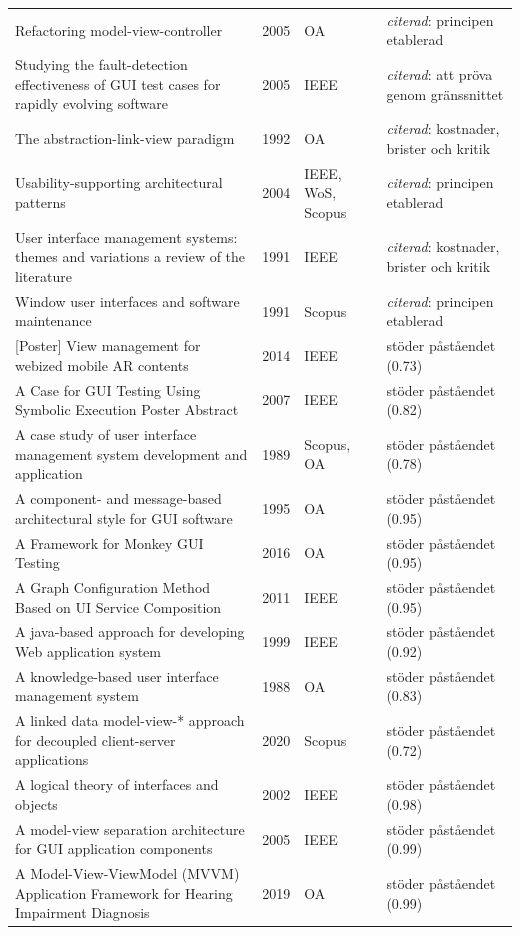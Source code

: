 \begin{longtable}{@{}%
  >{\raggedright\arraybackslash}p{}c%
  >{\raggedright\arraybackslash}p{}%
  >{\raggedright\arraybackslash}p{}@{}}
Refactoring model-view-controller & 2005 & OA & \emph{citerad}: principen etablerad \\
Studying the fault-detection effectiveness of GUI test cases for rapidly evolving software & 2005 & IEEE & \emph{citerad}: att pröva genom gränssnittet \\
The abstraction-link-view paradigm & 1992 & OA & \emph{citerad}: kostnader, brister och kritik \\
Usability-supporting architectural patterns & 2004 & IEEE, WoS, Scopus & \emph{citerad}: principen etablerad \\
User interface management systems: themes and variations a review of the literature & 1991 & IEEE & \emph{citerad}: kostnader, brister och kritik \\
Window user interfaces and software maintenance & 1991 & Scopus & \emph{citerad}: principen etablerad \\
{}[Poster] View management for webized mobile AR contents & 2014 & IEEE & stöder påståendet (0.73) \\
A Case for GUI Testing Using Symbolic Execution Poster Abstract & 2007 & IEEE & stöder påståendet (0.82) \\
A case study of user interface management system development and application & 1989 & Scopus, OA & stöder påståendet (0.78) \\
A component- and message-based architectural style for GUI software & 1995 & OA & stöder påståendet (0.95) \\
A Framework for Monkey GUI Testing & 2016 & OA & stöder påståendet (0.95) \\
A Graph Configuration Method Based on UI Service Composition & 2011 & IEEE & stöder påståendet (0.95) \\
A java-based approach for developing Web application system & 1999 & IEEE & stöder påståendet (0.92) \\
A knowledge-based user interface management system & 1988 & OA & stöder påståendet (0.83) \\
A linked data model-view-* approach for decoupled client-server applications & 2020 & Scopus & stöder påståendet (0.72) \\
A logical theory of interfaces and objects & 2002 & IEEE & stöder påståendet (0.98) \\
A model-view separation architecture for GUI application components & 2005 & IEEE & stöder påståendet (0.99) \\
A Model-View-ViewModel (MVVM) Application Framework for Hearing Impairment Diagnosis & 2019 & OA & stöder påståendet (0.99) \\

\end{longtable}
